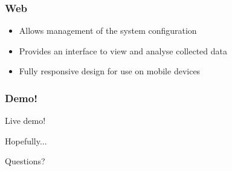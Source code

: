 \documentclass{beamer}
\begin{document}
	\begin{frame}
		\frametitle{Web}
		\begin{itemize}
			\item Allows management of the system configuration	
			\item Provides an interface to view and analyse collected data
			\item Fully responsive design for use on mobile devices
		\end{itemize}
	\end{frame}
	
	\begin{frame}
		\frametitle{Demo!}
		
		\begin{center}
			\huge Live demo!
			
			\tiny Hopefully...
		\end{center}		
	\end{frame}
	
	\begin{frame}
		Questions?
	\end{frame}
\end{document}
